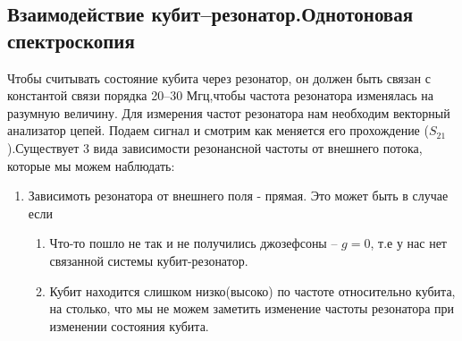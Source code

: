 \documentclass[12pt, a4paper, openany]{book}
\begin{document}
		\subsection{Взаимодействие кубит--резонатор.Однотоновая спектроскопия}
Чтобы считывать состояние кубита через резонатор, он должен быть связан с константой связи порядка 20--30 Мгц,чтобы частота резонатора изменялась на разумную величину. Для измерения частот резонатора нам необходим векторный анализатор цепей. Подаем сигнал и смотрим как меняется его прохождение ($S_{21}$).Существует 3 вида зависимости резонансной частоты от внешнего потока, которые мы можем наблюдать:
\begin{enumerate}
\item Зависимоть резонатора от внешнего поля - прямая. Это может быть в случае если 
	\begin{enumerate}
	\item Что-то пошло не так и не получились джозефсоны -- $g=0$, т.е у нас нет связанной системы кубит-резонатор.

	\item Кубит находится слишком низко(высоко) по частоте относительно кубита, на столько, что мы не можем заметить изменение частоты резонатора при изменении состояния кубита.


\end{enumerate}
\end{enumerate}
\end{document}
